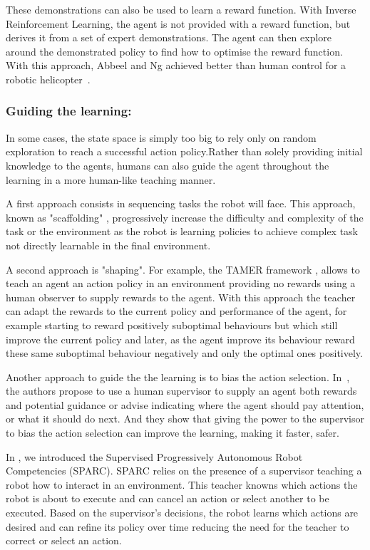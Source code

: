 \documentclass[letterpaper]{article} %
\begin{document}
These demonstrations can also be used to learn a reward function. With Inverse
Reinforcement Learning, the agent is not provided with a reward function, but
derives it from a set of expert demonstrations. The agent can then explore
around the demonstrated policy to find how to optimise the reward function. With
this approach, Abbeel and Ng achieved better than human control for a robotic
helicopter~\cite{abbeel2004apprenticeship}.

\subsubsection{Guiding the learning:}

In some cases, the state space is simply too big to rely only on random exploration to
reach a successful action policy.Rather than solely providing initial knowledge
to the agents, humans can also guide the agent throughout the learning in a more
human-like teaching manner. 

A first approach consists in sequencing tasks the robot will face. 
This approach, known as "scaffolding" \cite{saunders2006teaching}, progressively
increase the difficulty and complexity of the task or the environment as the
robot is learning policies to achieve complex task not directly learnable in the final
environment.

A second approach is "shaping". For example, the TAMER framework
\cite{knox2009interactively}, allows to teach an agent an action policy in an
environment providing no rewards using a human observer to supply rewards to the
agent. With this approach the teacher can adapt the
rewards to the current policy and performance of the agent, for example starting to reward
positively suboptimal behaviours but which still improve the current policy and
later, as the agent improve its behaviour reward these same suboptimal behaviour
negatively and only the optimal ones positively.

Another approach to guide the the learning is to bias the action selection.
In~\cite{thomaz2008teachable}, the authors propose to use a human supervisor to
supply  an agent both rewards and potential guidance or advise indicating where
the agent should pay attention, or what it should do next. And they show that
giving the power to the supervisor to bias the action selection can improve the
learning, making it faster, safer.

In \cite{senft2015sparc}, we introduced the Supervised Progressively
Autonomous Robot Competencies (SPARC). SPARC relies on the presence of a
supervisor teaching a robot how to interact in an environment. This teacher
knowns which actions the robot is about to execute and can cancel an action or
select another to be executed. Based on the supervisor's decisions, the robot
learns which actions are desired and can refine its policy over time reducing
the need for the teacher to correct or select an action.
\end{document}
